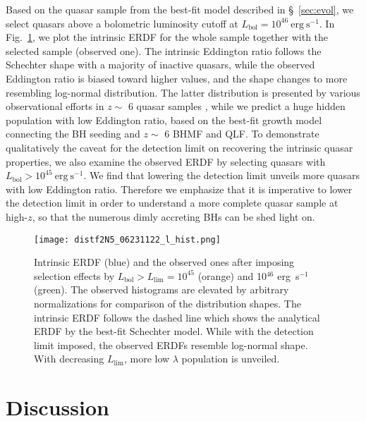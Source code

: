 \documentclass[twocolumn, twocolappendix]{aastex63}
\newcommand{\Lbol}{L_\mathrm{bol}}
\begin{document}
\begin{CJK*}{UTF8}{gbsn}
Based on the quasar sample from the best-fit model described in \S~\ref{sec:evol}, 
we select quasars above a bolometric luminosity cutoff at $\Lbol=10^{46}~\mathrm{erg~s^{-1}}$. 
In Fig.~\ref{fig:lhist}, we plot the intrinsic ERDF for the whole sample together with 
the selected sample (observed one). 
The intrinsic Eddington ratio follows the Schechter shape with a majority of inactive quasars, 
while the observed Eddington ratio is biased toward higher values, and the shape changes to 
more resembling log-normal distribution. 
The latter distribution is presented by various observational efforts in $z\sim$ 6 quasar samples
\citep[e.g.,][]{2010AJ....140..546W,2019ApJ...873...35S}, 
while we predict a huge hidden population with low Eddington ratio, 
based on the best-fit growth model connecting the BH seeding and $z\sim$ 6 BHMF and QLF. 
To demonstrate qualitatively the caveat for the detection limit on recovering the intrinsic quasar properties, 
we also examine the observed ERDF by selecting quasars with $\Lbol>10^{45}~\mathrm{erg~s^{-1}}$. 
We find that lowering the detection limit unveils more quasars with low Eddington ratio. 
Therefore we emphasize that it is imperative to lower the detection limit in order to 
understand a more complete quasar sample at high-$z$, 
so that the numerous dimly accreting BHs can be shed light on.



\begin{figure}
\centering
\texttt{[image: distf2N5\_06231122\_l\_hist.png]}
\caption{
Intrinsic ERDF (blue) and the observed ones after imposing selection effects by $\Lbol>L_\mathrm{lim}=10^{45}$ (orange) and 10$^{46}$ erg~s$^{-1}$ (green).
The observed histograms are elevated by arbitrary normalizations for comparison of the distribution shapes.
The intrinsic ERDF follows the dashed line which shows the analytical ERDF by the best-fit Schechter model. 
While with the detection limit imposed, the observed ERDFs resemble log-normal shape. 
With decreasing $L_\mathrm{lim}$, more low $\lambda$ population is unveiled.
}
\label{fig:lhist}
\end{figure}
  

\vspace{5mm}
\section{Discussion}\label{sec:discussion}



\end{CJK*}
\end{document}
